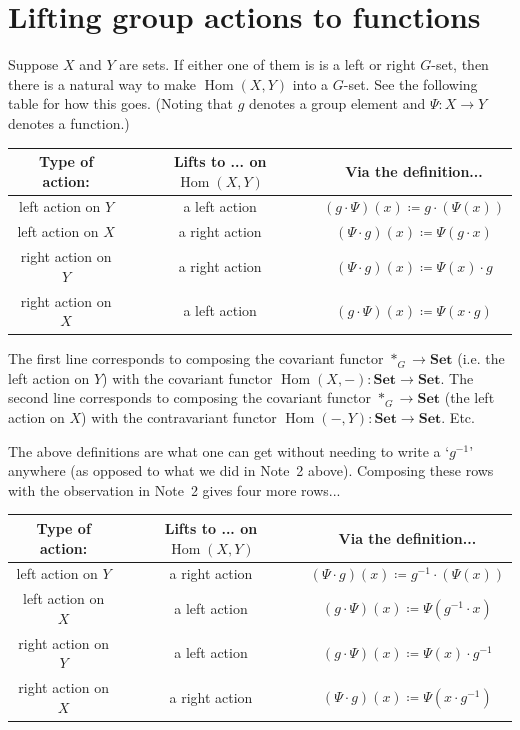 \documentclass[a4paper,11pt,twoside]{amsart}
\newcommand{\Hom}{\operatorname{Hom}}
\newcommand{\catname}[1]{{\textbf{#1}}}
\theoremstyle{definition}
\begin{document}
\section*{Lifting group actions to functions}
Suppose $X$ and $Y$ are sets. If either one of them is is a left or right $G$-set, then there is a natural way to make $\Hom(X,Y)$ into a $G$-set. See the following table for how this goes. (Noting that $g$ denotes a group element and $\Psi \colon X \to Y$ denotes a function.)

\smallskip

\begin{center}
\begin{tabular}{ |c|c|c| }
 \hline
 Type of action: & Lifts to ... on $\Hom(X,Y)$ & Via the definition... \\
 \hline
 left action on $Y$ & a left action & $(g \cdot \Psi)(x) \coloneqq g \cdot (\Psi(x))$ \\
 left action on $X$ & a right action & $(\Psi \cdot g)(x) \coloneqq \Psi(g \cdot x)$ \\
 right action on $Y$ & a right action & $(\Psi \cdot g)(x) \coloneqq \Psi(x) \cdot g$ \\
 right action on $X$ & a left action & $(g \cdot \Psi)(x) \coloneqq \Psi(x \cdot g)$ \\
 \hline
\end{tabular}
\end{center}
\smallskip

The first line corresponds to composing the covariant functor $\ast_G \to \catname{Set}$ (i.e. the left action on $Y$) with the covariant functor $\Hom(X, -) \colon \catname{Set} \to \catname{Set}.$ The second line corresponds to composing the covariant functor $\ast_G \to \catname{Set}$ (the left action on $X$) with the contravariant functor $\Hom(-,Y) \colon \catname{Set} \to \catname{Set}.$ Etc.

\bigskip
The above definitions are what one can get without needing to write a `$g^{-1}$' anywhere (as opposed to what we did in Note~2 above). Composing these rows with the observation in Note~2 gives four more rows...

\begin{center}
\begin{tabular}{ |c|c|c| }
 \hline
 Type of action: & Lifts to ... on $\Hom(X,Y)$ & Via the definition... \\
 \hline
 left action on $Y$ & a right action & $(\Psi \cdot g)(x) \coloneqq g^{-1} \cdot (\Psi(x))$ \\
 left action on $X$ & a left action & $(g \cdot \Psi)(x) \coloneqq \Psi(g^{-1} \cdot x)$ \\
 right action on $Y$ & a left action & $(g \cdot \Psi)(x) \coloneqq \Psi(x) \cdot g^{-1}$ \\
 right action on $X$ & a right action & $(\Psi \cdot g)(x) \coloneqq \Psi(x \cdot g^{-1})$ \\
 \hline
\end{tabular}
\end{center}
\end{document}
